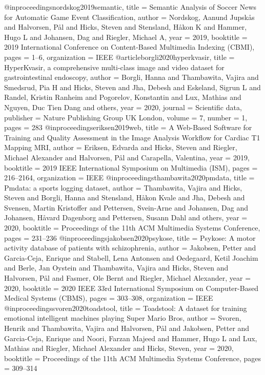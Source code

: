@inproceedings{nordskog2019semantic,
	title = {Semantic Analysis of Soccer News for Automatic Game Event Classification},
	author = {Nordskog, Aanund Jupsk{\aa}s and Halvorsen, P{\aa}l and Hicks, Steven and Stensland, H{\aa}kon K and Hammer, Hugo L and Johansen, Dag and Riegler, Michael A},
	year = 2019,
	booktitle = {2019 International Conference on Content-Based Multimedia Indexing (CBMI)},
	pages = {1--6},
	organization = {IEEE}
}
@article{borgli2020hyperkvasir,
	title = {HyperKvasir, a comprehensive multi-class image and video dataset for gastrointestinal endoscopy},
	author = {Borgli, Hanna and Thambawita, Vajira and Smedsrud, Pia H and Hicks, Steven and Jha, Debesh and Eskeland, Sigrun L and Randel, Kristin Ranheim and Pogorelov, Konstantin and Lux, Mathias and Nguyen, Duc Tien Dang and others},
	year = 2020,
	journal = {Scientific data},
	publisher = {Nature Publishing Group UK London},
	volume = 7,
	number = 1,
	pages = 283
}
@inproceedings{eriksen2019web,
	title = {A Web-Based Software for Training and Quality Assessment in the Image Analysis Workflow for Cardiac T1 Mapping MRI},
	author = {Eriksen, Edvarda and Hicks, Steven and Riegler, Michael Alexander and Halvorsen, P{\aa}l and Carapella, Valentina},
	year = 2019,
	booktitle = {2019 IEEE International Symposium on Multimedia (ISM)},
	pages = {216--2164},
	organization = {IEEE}
}
@inproceedings{thambawita2020pmdata,
	title = {Pmdata: a sports logging dataset},
	author = {Thambawita, Vajira and Hicks, Steven and Borgli, Hanna and Stensland, H{\aa}kon Kvale and Jha, Debesh and Svensen, Martin Kristoffer and Pettersen, Svein-Arne and Johansen, Dag and Johansen, H{\aa}vard Dagenborg and Pettersen, Susann Dahl and others},
	year = 2020,
	booktitle = {Proceedings of the 11th ACM Multimedia Systems Conference},
	pages = {231--236}
}
@inproceedings{jakobsen2020psykose,
	title = {Psykose: A motor activity database of patients with schizophrenia},
	author = {Jakobsen, Petter and Garcia-Ceja, Enrique and Stabell, Lena Antonsen and Oedegaard, Ketil Joachim and Berle, Jan Oystein and Thambawita, Vajira and Hicks, Steven and Halvorsen, P{\aa}l and Fasmer, Ole Bernt and Riegler, Michael Alexander},
	year = 2020,
	booktitle = {2020 IEEE 33rd International Symposium on Computer-Based Medical Systems (CBMS)},
	pages = {303--308},
	organization = {IEEE}
}
@inproceedings{svoren2020toadstool,
	title = {Toadstool: A dataset for training emotional intelligent machines playing Super Mario Bros},
	author = {Svoren, Henrik and Thambawita, Vajira and Halvorsen, P{\aa}l and Jakobsen, Petter and Garcia-Ceja, Enrique and Noori, Farzan Majeed and Hammer, Hugo L and Lux, Mathias and Riegler, Michael Alexander and Hicks, Steven},
	year = 2020,
	booktitle = {Proceedings of the 11th ACM Multimedia Systems Conference},
	pages = {309--314}
}

